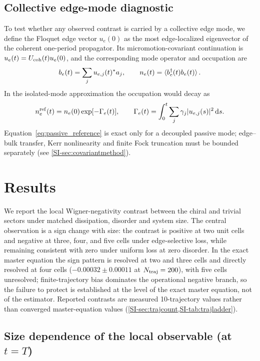 \documentclass[aps,pra,preprint,superscriptaddress,amsmath,amssymb]{revtex4-2}
\newcommand{\dd}{\mathrm{d}}
\begin{document}
\subsection{Collective edge-mode diagnostic}
\label{sec:edgeobservable}

To test whether any observed contrast is carried by a collective edge mode, we define the Floquet edge vector $u_e(0)$ as the most edge-localized eigenvector of the coherent one-period propagator. Its micromotion-covariant continuation is $u_e(t)=U_{\rm coh}(t)u_e(0)$, and the corresponding mode operator and occupation are
\begin{equation}\label{eq:edge_mode}
  b_e(t)=\sum_j u_{e,j}(t)^*a_j,
  \qquad
  n_e(t)=\braket{b_e^\dagger(t)b_e(t)}.
\end{equation}
In the isolated-mode approximation the occupation would decay as
\begin{equation}\label{eq:passive_reference}
  n_e^{\rm ref}(t)=n_e(0)\exp[-\Gamma_e(t)],
  \qquad
  \Gamma_e(t)=\int_0^t\sum_j\gamma_j|u_{e,j}(s)|^2\,\dd s.
\end{equation}
Equation~\eqref{eq:passive_reference} is exact only for a decoupled passive mode; edge--bulk transfer, Kerr nonlinearity and finite Fock truncation must be bounded separately (see \cref{SI-sec:covariantmethod}).

\section{Results}
\label{sec:results}

We report the local Wigner-negativity contrast between the chiral and trivial sectors under matched dissipation, disorder and system size. The central observation is a sign change with size: the contrast is positive at two unit cells and negative at three, four, and five cells under edge-selective loss, while remaining consistent with zero under uniform loss at zero disorder. In the exact master equation the sign pattern is resolved at two and three cells and directly resolved at four cells ($-\num{0.00032}\pm\num{0.00011}$ at $N_{\rm traj}=\num{200}$), with five cells unresolved; finite-trajectory bias dominates the operational negative branch, so the failure to protect is established at the level of the exact master equation, not of the estimator. Reported contrasts are measured \num{10}-trajectory values rather than converged master-equation values (\cref{SI-sec:trajcount,SI-tab:trajladder}).

\subsection{Size dependence of the local observable (at $t=T$)}
\label{sec:size}
\end{document}
